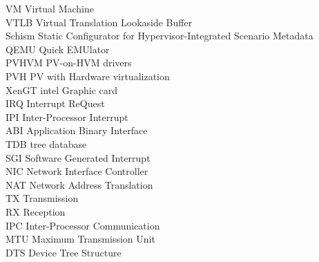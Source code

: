 \begin{tabbing}
VM  \> Virtual Machine \\
VTLB \> Virtual Translation Lookaside Buffer\\
Schism \> Static Configurator for Hypervisor-Integrated Scenario Metadata\\
QEMU \> Quick EMUlator \\
PVHVM \> PV-on-HVM drivers \\
PVH \> PV with Hardware virtualization \\
XenGT \> intel Graphic card \\
IRQ  \> Interrupt ReQuest \\
IPI \> Inter-Processor Interrupt \\
ABI \> Application Binary Interface \\
TDB \> tree database \\
SGI  \> Software Generated Interrupt \\
NIC \> Network Interface Controller \\
NAT  \> Network Address Translation \\
TX  \>  Transmission \\
RX  \> Reception \\
IPC \> Inter-Processor Communication \\
MTU \> Maximum Transmission Unit \\
DTS \> Device Tree Structure \\
\end{tabbing}
\endinput
